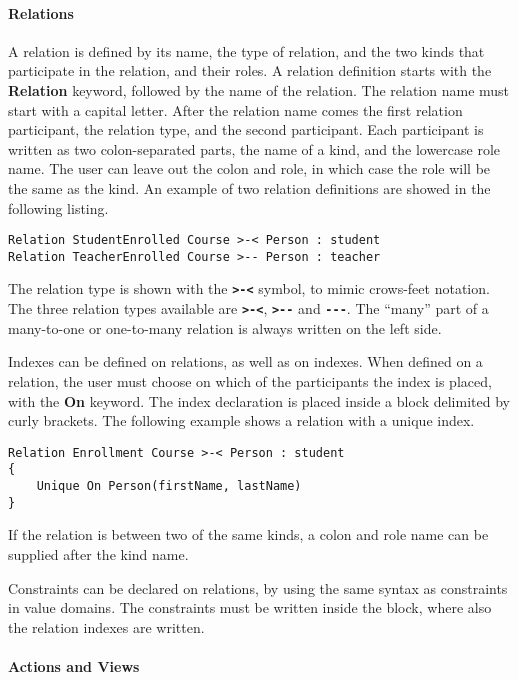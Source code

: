 \paragraph{Relations}

A relation is defined by its name, the type of relation, and the two
kinds that participate in the relation, and their roles. A relation
definition starts with the \textbf{Relation} keyword, followed by
the name of the relation. The relation name must start with a capital
letter. After the relation name comes the first relation participant,
the relation type, and the second participant. Each participant is
written as two colon-separated parts, the name of a kind, and the
lowercase role name. The user can leave out the colon and role, in
which case the role will be the same as the kind. An example of two
relation definitions are showed in the following listing.

\begin{lstlisting}[language=edma]
Relation StudentEnrolled Course >-< Person : student
Relation TeacherEnrolled Course >-- Person : teacher
\end{lstlisting}

The relation type is shown with the \texttt{\textbf{>-<}} symbol,
to mimic crows-feet notation. The three relation types available are
\texttt{\textbf{>-<}}, \texttt{\textbf{>-{}-}} and \texttt{\textbf{-{}-{}-}}.
The ``many'' part of a many-to-one or one-to-many relation is always
written on the left side.

Indexes can be defined on relations, as well as on indexes. When defined
on a relation, the user must choose on which of the participants the
index is placed, with the \textbf{On} keyword. The index declaration
is placed inside a block delimited by curly brackets. The following
example shows a relation with a unique index.

\begin{lstlisting}[language=edma]
Relation Enrollment Course >-< Person : student
{
	Unique On Person(firstName, lastName)
}
\end{lstlisting}

If the relation is between two of the same kinds, a colon and role
name can be supplied after the kind name.

Constraints can be declared on relations, by using the same syntax
as constraints in value domains. The constraints must be written inside
the block, where also the relation indexes are written.


\paragraph{Actions and Views}

